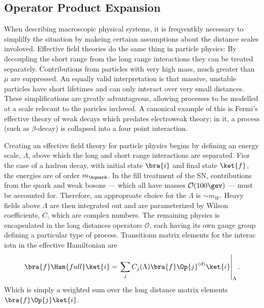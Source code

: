 \subsection{Operator Product Expansion}



When describing macroscopic physical systems, it is freqyentkly necessary to simplilfy the situation by makeing
certaian assumptions about the distance scales involoved.
Effective field theories do the same thing in particle physics:
By decoupling the short range from the long range interactions they can be treated separately.
Contributions from particles with very high mass, much greater than $\mu$ are suppressed.
An equally valid interpretation is that massive, unstable particles have short lifetimes and can
only interact over very small distances.
These simplifications are greatly advantageous, allowing processes to be modelled at a scale
relecant to the paricles invloved.
A canonical example of this is Fermi's effective theory of weak decays which predates electroweak
theory; in it, a process (such as $\beta$-decay) is collapsed into a four point interaction.

Creating an effective field theory for particle physics begins by defining an energy scale,
$\Lambda$, above which the long and short range interactions are separated.
Fior the case of a \bquark hadron decay, with initial state $\bra{i}$ and final state $\ket{f}$,
the energies are of order $m_\bquark$.
In the fill treatment of the SN, contributions from the \tquark quark and weak bosons --- which all
have masses $\mathcal{O}(100\gev)$ --- must be accounted for.
Therefore, an approproate choice for the $\Lambda$ is $\sim m_W$.
Heavy fields above $\Lambda$ are then integrated out and are parameterized by Wilson coefficients,
$C$, which are complex numbers.
The remaining physics is encapsulated in the long distances operators $\mathcal{O}$, each having
its own gauge group defining a particular type of process.
Transitionn matrix elements for the interac iotn in the effective Hamiltonian are
\begin{equation}
  \bra{f}\Ham{full}\ket{i} =
  \left.
  \sum_j C_j(\Lambda)\bra{f}\Op{j}^{(d)}\ket{i}\right|_{\Lambda}.
\end{equation}
Which is simply a weighted sum over the long distance matrix elements $\bra{f}\Op{j}\ket{i}$.

